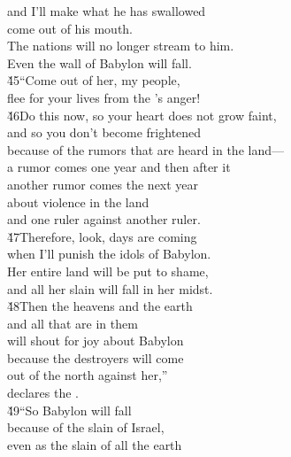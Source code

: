 \begin{poetry}
\poemll    and I'll make what he has swallowed \\
\poemlll       come out of his mouth. \\
\poeml The nations will no longer stream to him. \\
\poemll    Even the wall of Babylon will fall. \\
\poeml \v{45}``Come out of her, my people, \\
\poemll    flee for your lives from the 's anger! \\
\poeml \v{46}Do this now, so your heart does not grow faint, \\
\poemll    and so you don't become frightened \\
\poemlll       because of the rumors that are heard in the land--- \\
\poeml a rumor comes one year and then after it \\
\poemll    another rumor comes the next year \\
\poeml about violence in the land \\
\poemll    and one ruler against another ruler. \\
\poeml \v{47}Therefore, look, days are coming \\
\poemll    when I'll punish the idols of Babylon. \\
\poeml Her entire land will be put to shame, \\
\poemll    and all her slain will fall in her midst. \\
\poeml \v{48}Then the heavens and the earth \\
\poemll    and all that are in them \\
\poemlll       will shout for joy about Babylon \\
\poeml because the destroyers will come \\
\poemll    out of the north against her,'' \\
\poemlll       declares the . \\
\poeml \v{49}``So Babylon will fall \\
\poemll    because of the slain of Israel, \\
\poeml even as the slain of all the earth \\

\end{poetry}
